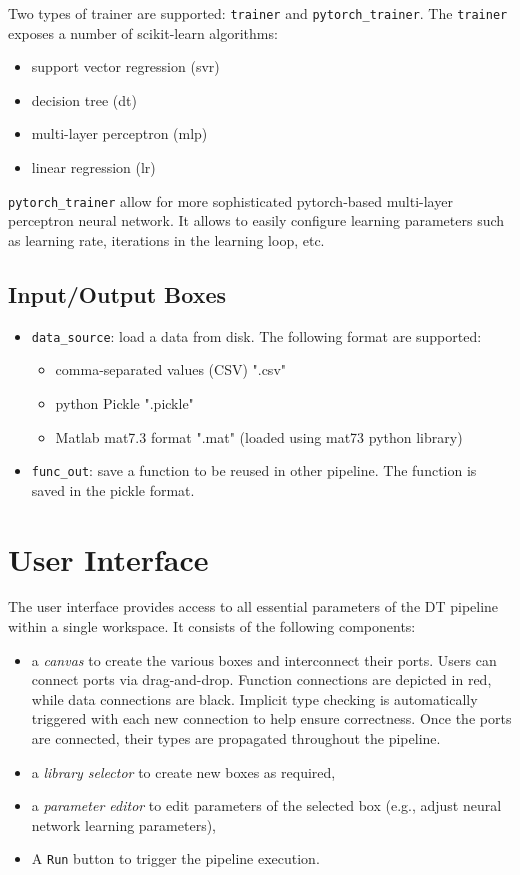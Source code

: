 Two types of trainer are supported: \verb|trainer| and \verb|pytorch_trainer|. The \verb|trainer| exposes a number of scikit-learn algorithms:
\begin{itemize}
    \item support vector regression (svr)
    \item decision tree (dt)
    \item multi-layer perceptron (mlp)
    \item linear regression (lr)
\end{itemize}

\verb|pytorch_trainer| allow for more sophisticated pytorch-based multi-layer
perceptron neural network. It allows to easily configure learning parameters
such as learning rate, iterations in the learning loop, etc.

\subsection{Input/Output Boxes}

\begin{itemize}
    \item \verb|data_source|: load a data from disk.
    The following format are supported: 
    \begin{itemize}
        \item comma-separated values (CSV) ".csv"
        \item python Pickle ".pickle"
        \item Matlab mat7.3 format ".mat" (loaded using mat73 python library)
    \end{itemize}
    \item \verb|func_out|: save a function to be reused in other pipeline. The function is saved in the pickle format.
\end{itemize}

\section{User Interface}

The {\Builder} user interface provides access to all essential parameters of the DT pipeline within a single workspace. It consists of the following components:
\begin{itemize}
    \item a \emph{canvas} to create the various boxes and interconnect their ports. 
    Users can connect ports via drag-and-drop. %
    Function connections are depicted in red, while data connections are black. Implicit type checking is automatically triggered with each new connection to help ensure correctness. Once the ports are connected, their types are propagated throughout the pipeline.
    \item a \emph{library selector} to create new boxes as required,
    \item a \emph{parameter editor} to edit parameters of the selected box (e.g., adjust neural network learning parameters),
    \item A \verb|Run| button to trigger the pipeline execution. 
\end{itemize}

